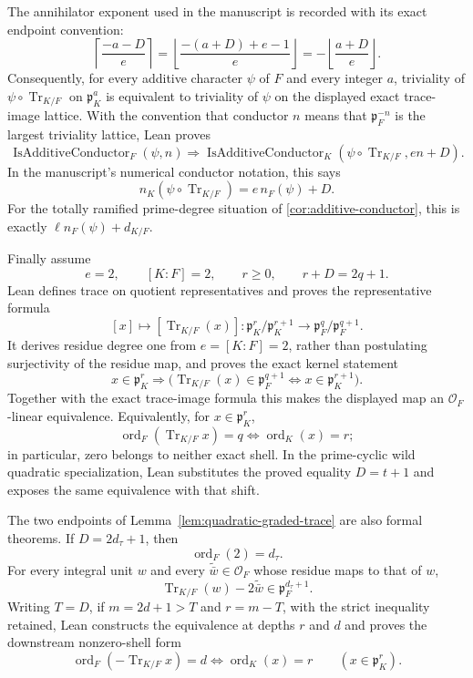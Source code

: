 \begin{theorem}
The annihilator exponent used in the manuscript is recorded with its exact
endpoint convention:
\[
 \left\lceil\frac{-a-D}{e}\right\rceil
 =\left\lfloor\frac{-(a+D)+e-1}{e}\right\rfloor
 =-\left\lfloor\frac{a+D}{e}\right\rfloor.
\]
Consequently, for every additive character $\psi$ of $F$ and every integer
$a$, triviality of $\psi\circ\operatorname{Tr}_{K/F}$ on
$\mathfrak p_K^a$ is equivalent to triviality of $\psi$ on the displayed
exact trace-image lattice.  With the convention that conductor $n$ means
that $\mathfrak p_F^{-n}$ is the largest triviality lattice, Lean proves
\[
 \operatorname{IsAdditiveConductor}_F(\psi,n)
 \Longrightarrow
 \operatorname{IsAdditiveConductor}_K
   (\psi\circ\operatorname{Tr}_{K/F},e n+D).
\]
In the manuscript's numerical conductor notation, this says
\[
 n_K(\psi\circ\operatorname{Tr}_{K/F})=e\,n_F(\psi)+D.
\]
For the totally ramified prime-degree situation of
\ref{cor:additive-conductor}, this is exactly
$\ell n_F(\psi)+d_{K/F}$.

Finally assume
\[
 e=2,\qquad [K:F]=2,\qquad r\geq0,
 \qquad r+D=2q+1.
\]
Lean defines trace on quotient representatives and proves the representative
formula
\[
 [x]\longmapsto[\operatorname{Tr}_{K/F}(x)]
 \colon
 \mathfrak p_K^r/\mathfrak p_K^{r+1}
 \longrightarrow
 \mathfrak p_F^q/\mathfrak p_F^{q+1}.
\]
It derives residue degree one from $e=[K:F]=2$, rather than postulating
surjectivity of the residue map, and proves the exact kernel statement
\[
 x\in\mathfrak p_K^r
 \Longrightarrow
 \bigl(\operatorname{Tr}_{K/F}(x)\in\mathfrak p_F^{q+1}
       \iff x\in\mathfrak p_K^{r+1}\bigr).
\]
Together with the exact trace-image formula this makes the displayed map an
$\mathcal O_F$-linear equivalence.  Equivalently, for
$x\in\mathfrak p_K^r$,
\[
 \operatorname{ord}_F(\operatorname{Tr}_{K/F}x)=q
 \iff \operatorname{ord}_K(x)=r;
\]
in particular, zero belongs to neither exact shell.  In the prime-cyclic
wild quadratic specialization, Lean substitutes the proved equality
$D=t+1$ and exposes the same equivalence with that shift.

The two endpoints of Lemma~\ref{lem:quadratic-graded-trace} are also formal
theorems.  If $D=2d_\tau+1$, then
\[
 \operatorname{ord}_F(2)=d_\tau.
\]
For every integral unit $w$ and every $\widetilde{\bar w}\in\mathcal O_F$
whose residue maps to that of $w$,
\[
 \operatorname{Tr}_{K/F}(w)-2\widetilde{\bar w}
 \in\mathfrak p_F^{d_\tau+1}.
\]
Writing $T=D$, if $m=2d+1>T$ and $r=m-T$, with the strict inequality retained, Lean
constructs the equivalence at depths $r$ and $d$ and proves the downstream
nonzero-shell form
\[
 \operatorname{ord}_F(-\operatorname{Tr}_{K/F}x)=d
 \iff \operatorname{ord}_K(x)=r
 \qquad(x\in\mathfrak p_K^r).
\]


\end{theorem}
